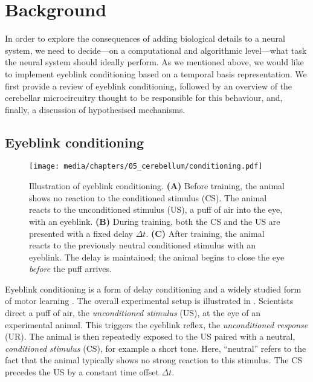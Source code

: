 
\section{Background}

In order to explore the consequences of adding biological details to a neural system, we need to decide---on a computational and algorithmic level---what task the neural system should ideally perform.
As we mentioned above, we would like to implement eyeblink conditioning based on a temporal basis representation.
We first provide a review of eyeblink conditioning, followed by an overview of the cerebellar microcircuitry thought to be responsible for this behaviour, and, finally, a discussion of hypothesised mechanisms.

\subsection{Eyeblink conditioning}

\begin{figure}
	\texttt{[image: media/chapters/05\_cerebellum/conditioning.pdf]}
	\caption[Illustration of eyeblink conditioning.]{
	Illustration of eyeblink conditioning.
	\textbf{(A)} Before training, the animal shows no reaction to the conditioned stimulus (CS).
	The animal reacts to the unconditioned stimulus (US), a puff of air into the eye, with an eyeblink.
	\textbf{(B)} During training, both the CS and the US are presented with a fixed delay $\Delta t$.
	\textbf{(C)} After training, the animal reacts to the previously neutral conditioned stimulus with an eyeblink. The delay is maintained; the animal begins to close the eye \emph{before} the puff arrives.
	}
	\label{fig:conditioning}
\end{figure}

Eyeblink conditioning is a form of delay conditioning and a widely studied form of motor learning \citep[e.g.,][Chapter~42, pp.~975-979]{kandel2012principles}.
The overall experimental setup is illustrated in .
Scientists direct a puff of air, the \emph{unconditioned stimulus} (US), at the eye of an experimental animal.
This triggers the eyeblink reflex, the \emph{unconditioned response} (UR).
The animal is then repeatedly exposed to the US paired with a neutral, \emph{conditioned stimulus} (CS), for example a short tone.
Here, \enquote{neutral} refers to the fact that the animal typically shows no strong reaction to this stimulus.
The CS precedes the US by a constant time offset $\Delta t$.

